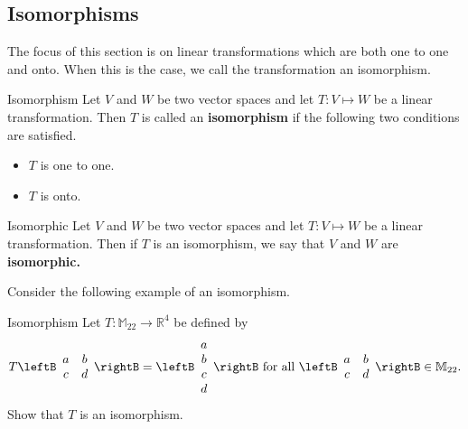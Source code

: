 \subsection{Isomorphisms}

The focus of this section is on linear transformations which are both one to one and onto. When this is the case, we call the transformation an isomorphism.

\begin{definition}{Isomorphism}\label{def:isomorphism}
Let $V$ and $W$ be two vector spaces and let $T: V \mapsto W$ be a linear transformation. 
Then $T$ is called an \textbf{isomorphism} 
if the following two conditions are satisfied.

\begin{itemize}
\item $T$ is one to one. 

\item $T$ is onto.
\end{itemize}
\end{definition}

\begin{definition}{Isomorphic}\label{def:isomorphic}
Let $V$ and $W$ be two vector spaces and let $T: V \mapsto W$ be a linear transformation. 
Then if $T$ is an isomorphism, we say that $V$ and $W$ are \textbf{isomorphic.}
\end{definition}

Consider the following example of an isomorphism.

\begin{example}{Isomorphism}\label{exa:isomorphism}
Let $T:\mathbb{M}_{22}\to\mathbb{R}^4$ be defined by
\[
T\leftB\begin{array}{cc} a & b \\ c & d \end{array}\rightB
=\leftB\begin{array}{c} a\\ b\\ c \\ d \end{array}\rightB
\mbox{ for all }
\leftB\begin{array}{cc} a & b \\ c & d \end{array}\rightB
\in\mathbb{M}_{22}. \]
Show that $T$ is an isomorphism.
\end{example}

